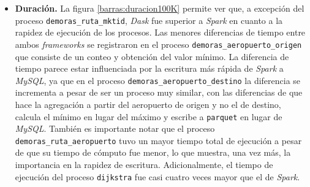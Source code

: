 \begin{itemize}
	\item \textbf{Duración.} La figura \ref{barras:duracion100K} permite ver que, a excepción del proceso \texttt{demoras\_ruta\_mktid}, \textit{Dask} fue superior a \textit{Spark} en cuanto a la rapidez de ejecución de los procesos. Las menores diferencias de tiempo entre ambos \textit{frameworks} se registraron en el proceso \texttt{demoras\_aeropuerto\_origen} que consiste de un conteo y obtención del valor mínimo. La diferencia de tiempo parece estar influenciada por la escritura más rápida de \textit{Spark} a \textit{MySQL}, ya que en el proceso \texttt{demoras\_aeropuerto\_destino} la diferencia se incrementa a pesar de ser un proceso muy similar, con las diferencias de que hace la agregación a partir del aeropuerto de origen y no el de destino, calcula el mínimo en lugar del máximo y escribe a \texttt{parquet} en lugar de \textit{MySQL}. También es importante notar que el proceso \texttt{demoras\_ruta\_aeropuerto} tuvo un mayor tiempo total de ejecución a pesar de que su tiempo de cómputo fue menor, lo que muestra, una vez más, la importancia en la rapidez de escritura. Adicionalmente, el tiempo de ejecución del proceso \texttt{dijkstra} fue casi cuatro veces mayor que el de \textit{Spark}.


\end{itemize}


